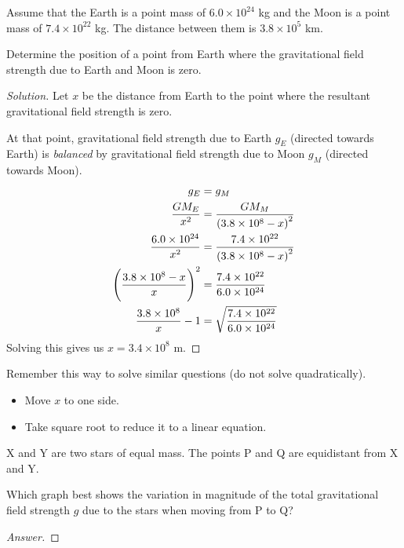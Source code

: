 \begin{prbm}
Assume that the Earth is a point mass of $6.0\times10^{24}$ \unit{kg} and the Moon is a point mass of $7.4\times10^{22}$ \unit{kg}. The distance between them is $3.8\times10^5$ \unit{km}. 

Determine the position of a point from Earth where the gravitational field strength due to Earth and Moon is zero.
\end{prbm}

\begin{proof}[Solution]
Let $x$ be the distance from Earth to the point where the resultant gravitational field strength is zero.

At that point, gravitational field strength due to Earth $g_E$ (directed towards Earth) is \emph{balanced} by gravitational field strength due to Moon $g_M$ (directed towards Moon).
\begin{align*}
g_E &= g_M \\
\frac{GM_E}{x^2} &= \frac{GM_M}{\left(3.8\times10^8-x\right)^2} \\
\frac{6.0\times10^{24}}{x^2} &= \frac{7.4\times10^{22}}{\left(3.8\times10^8-x\right)^2} \\
\left(\frac{3.8\times10^8-x}{x}\right)^2 &= \frac{7.4\times10^{22}}{6.0\times10^{24}} \\
\frac{3.8\times10^8}{x}-1 &= \sqrt{\frac{7.4\times10^{22}}{6.0\times10^{24}}}
\end{align*}
Solving this gives us $x=3.4\times10^8$ \unit{m}.
\end{proof}
\begin{remark}
Remember this way to solve similar questions (do not solve quadratically).
\begin{itemize}
\item Move $x$ to one side.
\item Take square root to reduce it to a linear equation.
\end{itemize}
\end{remark}
\pagebreak

\begin{prbm}[2014 P1 Q13]
X and Y are two stars of equal mass. The points P and Q are equidistant from X and Y.

Which graph best shows the variation in magnitude of the total gravitational field strength $g$ due to the stars when moving from P to Q?
\end{prbm}

\begin{proof}[Answer]

\end{proof}

